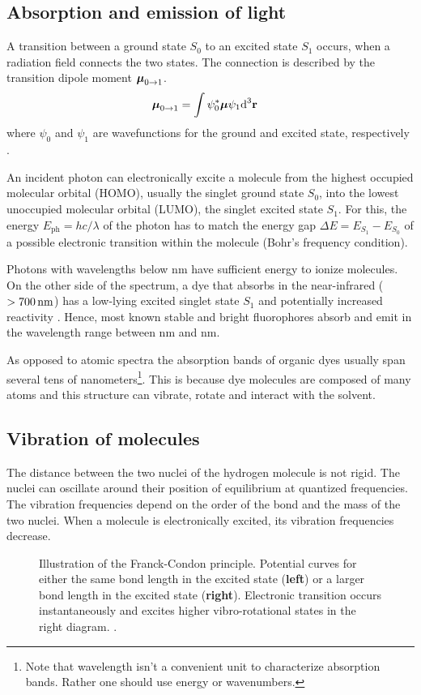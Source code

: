 \subsection{Absorption and emission of light}
A transition between a ground state $S_0$ to an excited state $S_1$
occurs, when a radiation field connects the two states. The connection
is described by the transition dipole moment
$\mbox{\boldmath{$\mu$}}_{0\rightarrow 1}$.
\begin{align}
  \mbox{\boldmath{$\mu$}}_{0\rightarrow 1} &= \int \psi^*_0 \mbox{\boldmath{$\mu$}} \psi_1 \textrm{d}^3\mathbf{r}
\end{align}
where $\psi_0$ and $\psi_1$ are wavefunctions for the ground and
excited state, respectively \citep{Klessinger1989}.

An incident photon can electronically excite a molecule from the
highest occupied molecular orbital (HOMO), usually the singlet ground
state $S_0$, into the lowest unoccupied molecular orbital (LUMO), the
singlet excited state $S_1$. For this, the energy $E_\textrm{ph}=hc/\lambda$ of the
photon has to match the energy gap $\Delta E=E_{S_1}-E_{S_0}$ of a
possible electronic transition within the molecule (Bohr's frequency
condition).

Photons with wavelengths below \unit[200]{nm} have sufficient energy
to ionize molecules. On the other side of the spectrum, a dye that
absorbs in the near-infrared ($\unit[>700]{nm}$) has a low-lying
excited singlet state $S_1$ and potentially increased reactivity
\citep{Sauer2011}. Hence, most known stable and bright fluorophores
absorb and emit in the wavelength range between \unit[300]{nm} and
\unit[700]{nm}.

As opposed to atomic spectra the absorption bands of organic dyes
usually span several tens of nanometers\footnote{Note that wavelength
  isn't a convenient unit to characterize absorption bands. Rather one
  should use energy or wavenumbers.}. This is because dye molecules
are composed of many atoms and this structure can vibrate, rotate and
interact with the solvent.
\subsection{Vibration of molecules}
The distance between the two nuclei of the hydrogen molecule is not
rigid. The nuclei can oscillate around their position of equilibrium
at quantized frequencies. The vibration frequencies depend on the
order of the bond and the mass of the two nuclei. When a molecule is
electronically excited, its vibration frequencies decrease.
\begin{figure}[!hbt]
  \centering
  
  \caption{Illustration of the Franck-Condon principle. Potential
    curves for either the same bond length in the
    excited state ({\bf left}) or a larger bond length in the
    excited state ({\bf right}). Electronic transition occurs
    instantaneously and excites higher vibro-rotational states in the
    right diagram. \citep[inspired from][p.~276]{Haken2006}.}
  \label{fig:flu-condon}
\end{figure}

